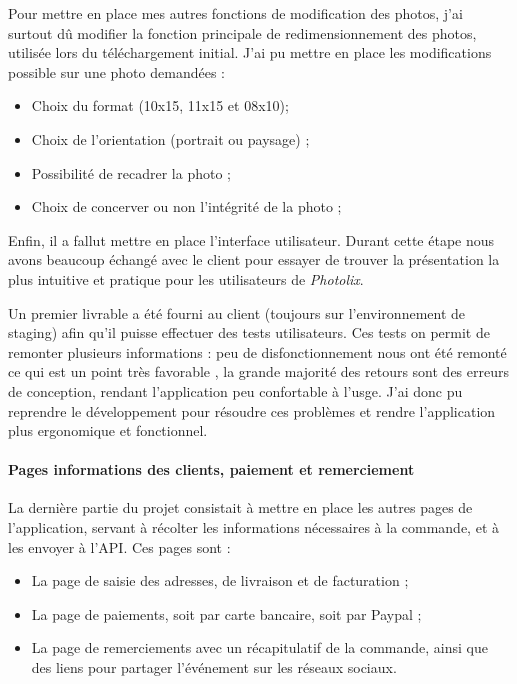 \documentclass[12pt,a4paper]{article}
\providecommand{\tightlist}{%
  \setlength{\itemsep}{0pt}\setlength{\parskip}{0pt}}
\begin{document}
  \bigskip

  Pour mettre en place mes autres fonctions de modification des photos,
  j'ai surtout dû modifier la fonction principale de redimensionnement des
  photos, utilisée lors du téléchargement initial. J'ai pu mettre en place
  les modifications possible sur une photo demandées :

  \begin{itemize}
  \tightlist
  \item
    Choix du format (10x15, 11x15 et 08x10);
  \item
    Choix de l'orientation (portrait ou paysage) ;
  \item
    Possibilité de recadrer la photo ;
  \item
    Choix de concerver ou non l'intégrité de la photo ;
  \end{itemize}

  \bigskip

  Enfin, il a fallut mettre en place l'interface utilisateur. Durant cette
  étape nous avons beaucoup échangé avec le client pour essayer de trouver
  la présentation la plus intuitive et pratique pour les utilisateurs de
  \emph{Photolix}.

  Un premier livrable a été fourni au client (toujours sur l'environnement
  de staging) afin qu'il puisse effectuer des tests utilisateurs. Ces
  tests on permit de remonter plusieurs informations : peu de
  disfonctionnement nous ont été remonté ce qui est un point très
  favorable , la grande majorité des retours sont des erreurs de
  conception, rendant l'application peu confortable à l'usge. J'ai donc pu
  reprendre le développement pour résoudre ces problèmes et rendre
  l'application plus ergonomique et fonctionnel.

  \paragraph{Pages informations des clients, paiement et
  remerciement}\label{pages-informations-des-clients-paiement-et-remerciement}

  \bigskip

  La dernière partie du projet consistait à mettre en place les autres
  pages de l'application, servant à récolter les informations nécessaires
  à la commande, et à les envoyer à l'API. Ces pages sont :

  \begin{itemize}
  \tightlist
  \item
    La page de saisie des adresses, de livraison et de facturation ;
  \item
    La page de paiements, soit par carte bancaire, soit par Paypal ;
  \item
    La page de remerciements avec un récapitulatif de la commande, ainsi
    que des liens pour partager l'événement sur les réseaux sociaux.
  \end{itemize}
\end{document}
